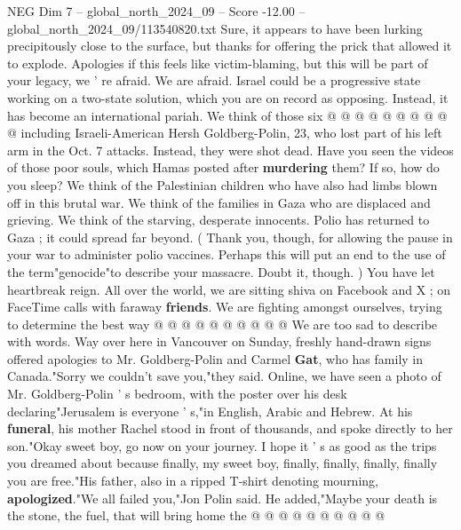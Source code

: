 \begin{textsample}{NEG Dim 7 – global\_north\_2024\_09 – Score -12.00 – global\_north\_2024\_09/113540820.txt}
Sure, it appears to have been lurking precipitously close to the surface, but thanks for offering the prick that allowed it to explode.
Apologies if this feels like victim-blaming, but this will be part of your legacy, we ' re afraid.
We are afraid.
Israel could be a progressive state working on a two-state solution, which you are on record as opposing.
Instead, it has become an international pariah.
We think of those six @ @ @ @ @ @ @ @ @ @ including Israeli-American Hersh Goldberg-Polin, 23, who lost part of his left arm in the Oct. 7 attacks.
Instead, they were shot dead.
Have you seen the videos of those poor souls, which Hamas posted after \textbf{murdering} them?
If so, how do you sleep?
We think of the Palestinian children who have also had limbs blown off in this brutal war.
We think of the families in Gaza who are displaced and grieving.
We think of the starving, desperate innocents.
Polio has returned to Gaza ; it could spread far beyond. ( Thank you, though, for allowing the pause in your war to administer polio vaccines.
Perhaps this will put an end to the use of the term"genocide"to describe your massacre.
Doubt it, though. ) You have let heartbreak reign.
All over the world, we are sitting shiva on Facebook and X ; on FaceTime calls with faraway \textbf{friends}.
We are fighting amongst ourselves, trying to determine the best way @ @ @ @ @ @ @ @ @ @ We are too sad to describe with words.
Way over here in Vancouver on Sunday, freshly hand-drawn signs offered apologies to Mr.
Goldberg-Polin and Carmel \textbf{Gat}, who has family in Canada."Sorry we couldn't save you,"they said.
Online, we have seen a photo of Mr.
Goldberg-Polin ' s bedroom, with the poster over his desk declaring"Jerusalem is everyone ' s,"in English, Arabic and Hebrew.
At his \textbf{funeral}, his mother Rachel stood in front of thousands, and spoke directly to her son."Okay sweet boy, go now on your journey.
I hope it ' s as good as the trips you dreamed about because finally, my sweet boy, finally, finally, finally, finally you are free."His father, also in a ripped T-shirt denoting mourning, \textbf{apologized}."We all failed you,"Jon Polin said.
He added,"Maybe your death is the stone, the fuel, that will bring home the @ @ @ @ @ @ @ @ @ @

\end{textsample}
